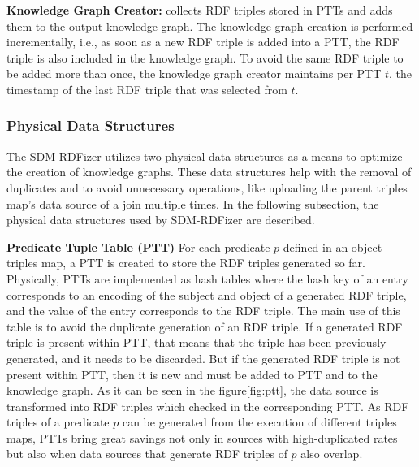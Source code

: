 \noindent\textbf{Knowledge Graph Creator:} collects RDF triples stored in PTTs and adds them to the output knowledge graph. The knowledge graph creation is performed incrementally, i.e., as soon as a new RDF triple is added into a PTT, the RDF triple is also included in the knowledge graph. To avoid the same RDF triple to be added more than once, the knowledge graph creator maintains per PTT $t$, the timestamp of the last RDF triple that was selected from $t$. 

\subsubsection{Physical Data Structures}
The SDM-RDFizer utilizes two physical data structures as a means to optimize the creation of knowledge graphs. These data structures help with the removal of duplicates and to avoid unnecessary operations, like uploading the parent triples map's data source of a join multiple times. In the following subsection, the physical data structures used by SDM-RDFizer are described. 
\label{pds}

\noindent\textbf{Predicate Tuple Table (PTT)} 
For each predicate $p$ defined in an object triples map, a PTT is created to store the RDF triples generated so far. Physically, PTTs are implemented as hash tables where the hash key of an entry corresponds to an encoding of the subject and object of a generated RDF triple, and the value of the entry corresponds to the RDF triple. The main use of this table is to avoid the duplicate generation of an RDF triple. 
If a generated RDF triple is present within PTT, that means that the triple has been previously generated, and it needs to be discarded. But if the generated RDF triple is not present within PTT, then it is new and must be added to PTT and to the knowledge graph. As it can be seen in the figure\autoref{fig:ptt}, the data source is transformed into RDF triples which checked in the corresponding PTT. As RDF triples of a predicate $p$ can be generated from the execution of different triples maps, PTTs bring great savings not only in sources with high-duplicated rates but also when data sources that generate RDF triples of $p$ also overlap.  

